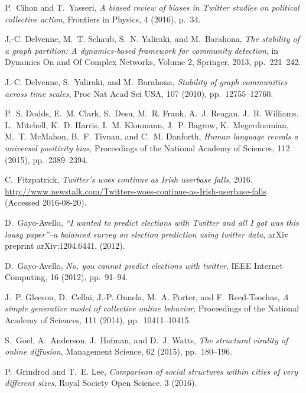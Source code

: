 \documentclass{article}
\begin{document}
\begin{thebibliography}{10}
{\sc P.~Cihon and T.~Yasseri}, {\em A biased review of biases in {T}witter
  studies on political collective action}, Frontiers in Physics, 4 (2016),
  p.~34.

{\sc J.-C. Delvenne, M.~T. Schaub, S.~N. Yaliraki, and M.~Barahona}, {\em The
  stability of a graph partition: A dynamics-based framework for community
  detection}, in Dynamics On and Of Complex Networks, Volume 2, Springer, 2013,
  pp.~221--242.

{\sc J.-C. Delvenne, S.~Yaliraki, and M.~Barahona}, {\em Stability of graph
  communities across time scales}, Proc Nat Acad Sci USA, 107 (2010),
  pp.~12755--12760.

{\sc P.~S. Dodds, E.~M. Clark, S.~Desu, M.~R. Frank, A.~J. Reagan, J.~R.
  Williams, L.~Mitchell, K.~D. Harris, I.~M. Kloumann, J.~P. Bagrow,
  K.~Megerdoomian, M.~T. McMahon, B.~F. Tivnan, and C.~M. Danforth}, {\em Human
  language reveals a universal positivity bias}, Proceedings of the National
  Academy of Sciences, 112 (2015), pp.~2389--2394.

{\sc C.~Fitzpatrick}, {\em Twitter's woes continue as {I}rish userbase falls},
  2016.
\newblock
  \url{http://www.newstalk.com/Twitters-woes-continue-as-Irish-userbase-falls}
  (Accessed 2016-08-20).

{\sc D.~Gayo-Avello}, {\em ``{I} wanted to predict elections with {T}witter and
  all {I} got was this lousy paper''--a balanced survey on election prediction
  using twitter data}, arXiv preprint arXiv:1204.6441,  (2012).

{\sc D.~Gayo-Avello}, {\em No, you cannot predict elections with twitter}, IEEE
  Internet Computing, 16 (2012), pp.~91--94.

{\sc J.~P. Gleeson, D.~Cellai, J.-P. Onnela, M.~A. Porter, and
  F.~Reed-Tsochas}, {\em A simple generative model of collective online
  behavior}, Proceedings of the National Academy of Sciences, 111 (2014),
  pp.~10411--10415.

{\sc S.~Goel, A.~Anderson, J.~Hofman, and D.~J. Watts}, {\em The structural
  virality of online diffusion}, Management Science, 62 (2015), pp.~180--196.

{\sc P.~Grindrod and T.~E. Lee}, {\em Comparison of social structures within
  cities of very different sizes}, Royal Society Open Science, 3 (2016).


\end{thebibliography}
\end{document}
